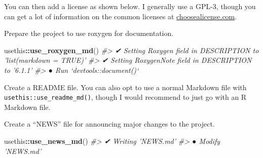 \documentclass[]{book}
\newenvironment{Shaded}{\begin{snugshade}}{\end{snugshade}}
\newcommand{\KeywordTok}[1]{\textcolor[rgb]{0.13,0.29,0.53}{\textbf{#1}}}
\newcommand{\DataTypeTok}[1]{\textcolor[rgb]{0.13,0.29,0.53}{#1}}
\newcommand{\StringTok}[1]{\textcolor[rgb]{0.31,0.60,0.02}{#1}}
\newcommand{\CommentTok}[1]{\textcolor[rgb]{0.56,0.35,0.01}{\textit{#1}}}
\newcommand{\OperatorTok}[1]{\textcolor[rgb]{0.81,0.36,0.00}{\textbf{#1}}}
\newcommand{\NormalTok}[1]{#1}
\begin{document}
You can then add a license as shown below. I generally use a GPL-3,
though you can get a lot of information on the common licenses at
\href{https://choosealicense.com}{choosealicense.com}.

\begin{Shaded}
\end{Shaded}

Prepare the project to use roxygen for documentation.

\begin{Shaded}
\begin{Highlighting}[]
\NormalTok{usethis}\OperatorTok{::}\KeywordTok{use_roxygen_md}\NormalTok{()}
\CommentTok{#> ✔ Setting Roxygen field in DESCRIPTION to 'list(markdown = TRUE)'}
\CommentTok{#> ✔ Setting RoxygenNote field in DESCRIPTION to '6.1.1'}
\CommentTok{#> ● Run `devtools::document()`}
\end{Highlighting}
\end{Shaded}

Create a README file. You can also opt to use a normal Markdown file
with \texttt{usethis::use\_readme\_md()}, though I would recommend to
just go with an R Markdown file.

\begin{Shaded}
\end{Shaded}

Create a ``NEWS'' file for announcing major changes to the project.

\begin{Shaded}
\begin{Highlighting}[]
\NormalTok{usethis}\OperatorTok{::}\KeywordTok{use_news_md}\NormalTok{()}
\CommentTok{#> ✔ Writing 'NEWS.md'}
\CommentTok{#> ● Modify 'NEWS.md'}
\end{Highlighting}
\end{Shaded}
\end{document}
